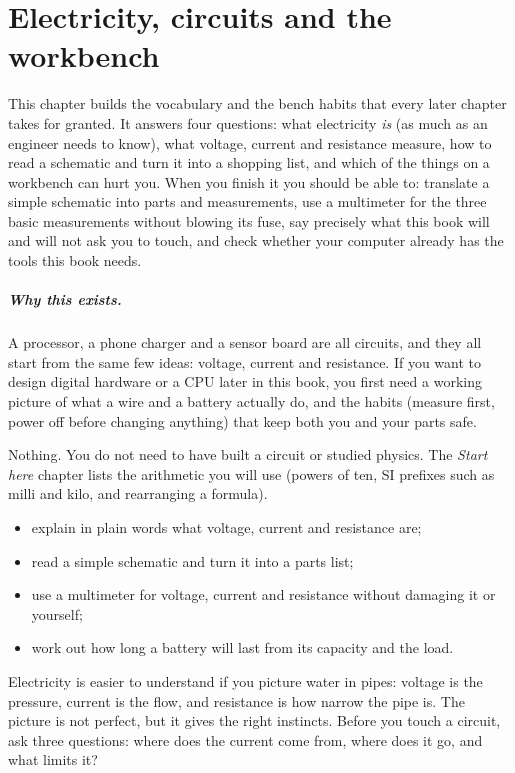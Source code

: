 \chapter{Electricity, circuits and the workbench}
\label{ch:workbench}

This chapter builds the vocabulary and the bench habits that every later chapter
takes for granted. It answers four questions: what electricity \emph{is}
(as much as an engineer needs to know), what voltage, current and resistance
measure, how to read a schematic and turn it into a shopping list, and which of
the things on a workbench can hurt you. When you finish it you should be able
to: translate a simple schematic into parts and measurements, use a multimeter
for the three basic measurements without blowing its fuse, say precisely what
this book will and will not ask you to touch, and check whether your computer
already has the tools this book needs.

\paragraph{Why this exists.} A processor, a phone charger and a sensor board are all
circuits, and they all start from the same few ideas: voltage, current and resistance. If you want to
design digital hardware or a CPU later in this book, you first need a working picture of what a wire and a
battery actually do, and the habits (measure first, power off before changing anything) that keep both you
and your parts safe.

\begin{rulebox}
Nothing. You do not need to have built a circuit or studied physics. The \emph{Start here} chapter lists the arithmetic you will use (powers of ten, SI prefixes such as milli and kilo, and rearranging a formula).
\end{rulebox}
\begin{wins}
\begin{itemize}
\item explain in plain words what voltage, current and resistance are;
\item read a simple schematic and turn it into a parts list;
\item use a multimeter for voltage, current and resistance without damaging it or yourself;
\item work out how long a battery will last from its capacity and the load.
\end{itemize}
\end{wins}
\begin{principle}
Electricity is easier to understand if you picture water in pipes: voltage is the pressure, current is the flow, and resistance is how narrow the pipe is. The picture is not perfect, but it gives the right instincts. Before you touch a circuit, ask three questions: where does the current come from, where does it go, and what limits it?
\end{principle}

